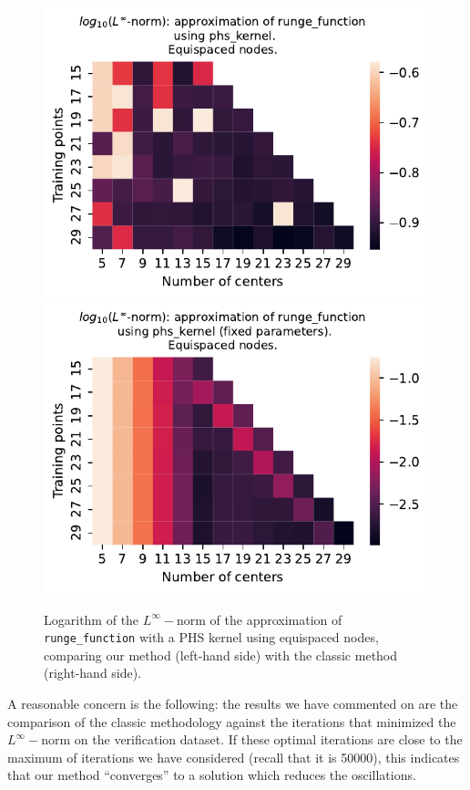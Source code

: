\documentclass[12pt]{report} %
\begin{document}
\begin{figure}[ht]
    \centering
    \includegraphics[width=.49\textwidth]{imagenes/experiments/1d/variational/runge_function-Kphs_kernel-Equi.pdf}
    \includegraphics[width=.49\textwidth]{imagenes/experiments/1d/least_squares/opt-runge_function-Kphs_kernel-Equi.pdf}
    \caption{Logarithm of the $L^\infty-$norm of the approximation of \texttt{runge\_function} with a PHS kernel using equispaced nodes, comparing our method (left-hand side) with the classic method (right-hand side).}
    \label{fig:runge-function-phs-kernel-equi-comparison-methods}
\end{figure}


A reasonable concern is the following: the results we have commented on are the comparison of the classic methodology against the iterations that minimized the $L^\infty-$norm on the verification dataset. If these optimal iterations are close to the maximum of iterations we have considered (recall that it is 50000), this indicates that our method ``converges'' to a solution which reduces the oscillations.%
\end{document}
